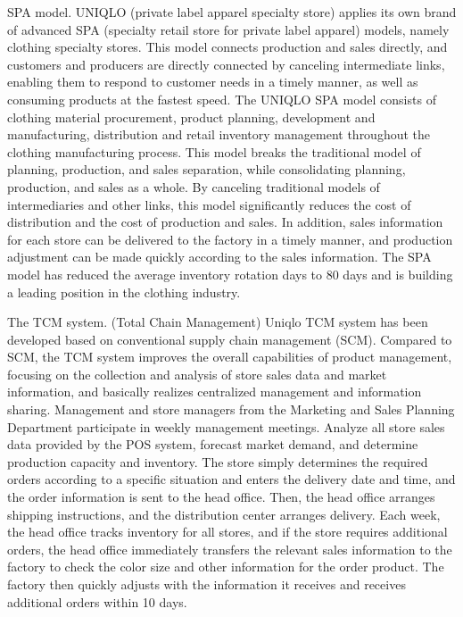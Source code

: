 \documentclass[12pt,]{article}
\begin{document}
SPA model. UNIQLO (private label apparel specialty store) applies its
own brand of advanced SPA (specialty retail store for private label
apparel) models, namely clothing specialty stores. This model connects
production and sales directly, and customers and producers are directly
connected by canceling intermediate links, enabling them to respond to
customer needs in a timely manner, as well as consuming products at the
fastest speed. The UNIQLO SPA model consists of clothing material
procurement, product planning, development and manufacturing,
distribution and retail inventory management throughout the clothing
manufacturing process. This model breaks the traditional model of
planning, production, and sales separation, while consolidating
planning, production, and sales as a whole. By canceling traditional
models of intermediaries and other links, this model significantly
reduces the cost of distribution and the cost of production and sales.
In addition, sales information for each store can be delivered to the
factory in a timely manner, and production adjustment can be made
quickly according to the sales information. The SPA model has reduced
the average inventory rotation days to 80 days and is building a leading
position in the clothing industry.

The TCM system. (Total Chain Management) Uniqlo TCM system has been
developed based on conventional supply chain management (SCM). Compared
to SCM, the TCM system improves the overall capabilities of product
management, focusing on the collection and analysis of store sales data
and market information, and basically realizes centralized management
and information sharing. Management and store managers from the
Marketing and Sales Planning Department participate in weekly management
meetings. Analyze all store sales data provided by the POS system,
forecast market demand, and determine production capacity and inventory.
The store simply determines the required orders according to a specific
situation and enters the delivery date and time, and the order
information is sent to the head office. Then, the head office arranges
shipping instructions, and the distribution center arranges delivery.
Each week, the head office tracks inventory for all stores, and if the
store requires additional orders, the head office immediately transfers
the relevant sales information to the factory to check the color size
and other information for the order product. The factory then quickly
adjusts with the information it receives and receives additional orders
within 10 days.
\end{document}
